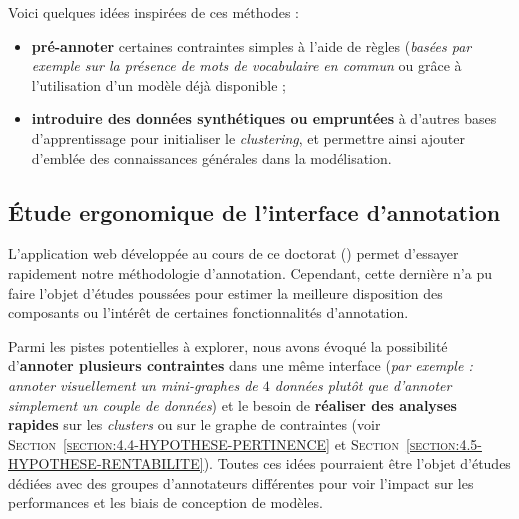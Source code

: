 		Voici quelques idées inspirées de ces méthodes :
		\begin{itemize}
			\item \textbf{pré-annoter} certaines contraintes simples à l'aide de règles (\textit{basées par exemple sur la présence de mots de vocabulaire en commun} ou grâce à l'utilisation d'un modèle déjà disponible ; 
			\item \textbf{introduire des données synthétiques ou empruntées} à d'autres bases d'apprentissage pour initialiser le \textit{clustering}, et permettre ainsi ajouter d'emblée des connaissances générales dans la modélisation.
		\end{itemize}
	
	
	\subsection{Étude ergonomique de l'interface d'annotation}
	\label{section:4.7.5-HYPOTHESES-NON-VERIFIEES-ERGONOMIQUE}
	
		L'application web développée au cours de ce doctorat (\cite{schild-etal:2022:cognitivefactory-interactiveclusteringgui}) permet d'essayer rapidement notre méthodologie d'annotation.
		Cependant, cette dernière n'a pu faire l'objet d'études poussées pour estimer la meilleure disposition des composants ou l'intérêt de certaines fonctionnalités d'annotation.
		
		Parmi les pistes potentielles à explorer, nous avons évoqué la possibilité d'\textbf{annoter plusieurs contraintes} dans une même interface (\textit{par exemple : annoter visuellement un mini-graphes de $4$ données plutôt que d'annoter simplement un couple de données}) et le besoin de \textbf{réaliser des analyses rapides} sur les \textit{clusters} ou sur le graphe de contraintes (voir \textsc{Section~\ref{section:4.4-HYPOTHESE-PERTINENCE}} et \textsc{Section~\ref{section:4.5-HYPOTHESE-RENTABILITE}}).
		Toutes ces idées pourraient être l'objet d'études dédiées avec des groupes d'annotateurs différentes pour voir l'impact sur les performances et les biais de conception de modèles.